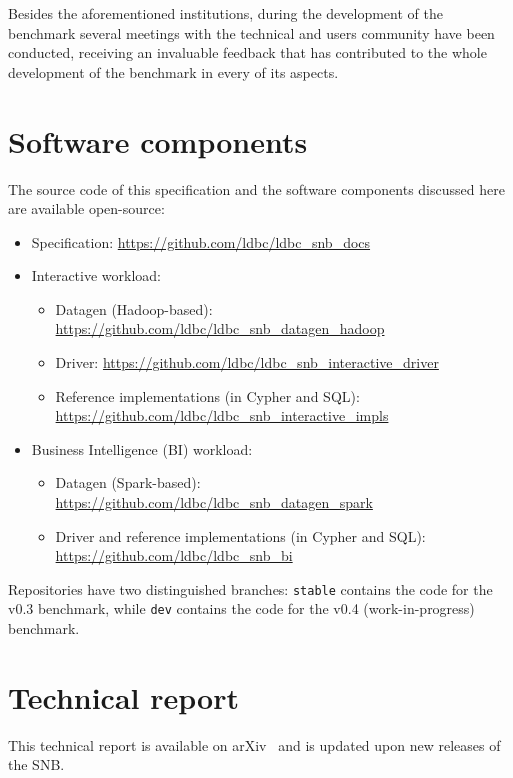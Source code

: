\begin{figure}
\end{figure}

Besides the aforementioned institutions, during the development of the
benchmark several meetings with the technical and users community have been
conducted, receiving an invaluable feedback that has contributed to the whole
development of the benchmark in every of its aspects.


\section{Software components}

The source code of this specification and the software components discussed here are available open-source:

\begin{itemize}
    \item Specification: \url{https://github.com/ldbc/ldbc_snb_docs}
    \item Interactive workload:
        \begin{itemize}
            \item Datagen (Hadoop-based): \url{https://github.com/ldbc/ldbc_snb_datagen_hadoop}
            \item Driver: \url{https://github.com/ldbc/ldbc_snb_interactive_driver}
            \item Reference implementations (in Cypher and SQL): \url{https://github.com/ldbc/ldbc_snb_interactive_impls}
        \end{itemize}
    \item Business Intelligence (BI) workload:
        \begin{itemize}
            \item Datagen (Spark-based): \url{https://github.com/ldbc/ldbc_snb_datagen_spark}
            \item Driver and reference implementations (in Cypher and SQL): \url{https://github.com/ldbc/ldbc_snb_bi}
        \end{itemize}
\end{itemize}

Repositories have two distinguished branches:
\texttt{stable} contains the code for the v0.3 benchmark, while
\texttt{dev} contains the code for the v0.4 (work-in-progress) benchmark.


\section{Technical report}

This technical report is available on arXiv~\cite{DBLP:journals/corr/abs-2001-02299} and is updated upon new releases of the SNB.

